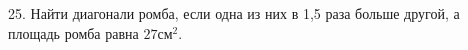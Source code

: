25. Найти диагонали ромба, если одна из них в 1,5 раза больше другой, а площадь ромба равна $27\text{см}^2.$\\

